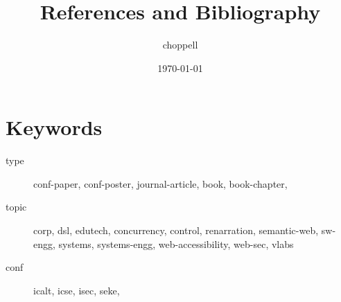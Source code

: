 \documentclass[11pt]{article}
\author{choppell}
\date{\today}
\title{References and Bibliography}
\begin{document}
\maketitle
\tableofcontents


\section{Keywords}
\label{sec:orgea76e27}
\begin{description}
\item[{type}] conf-paper, conf-poster, journal-article, book,
book-chapter,

\item[{topic}] corp, dsl, edutech, concurrency, control, renarration,
semantic-web, sw-engg, systems, systems-engg,
web-accessibility, web-sec, vlabs

\item[{conf}] icalt, icse, isec, seke,
\end{description}
\end{document}

